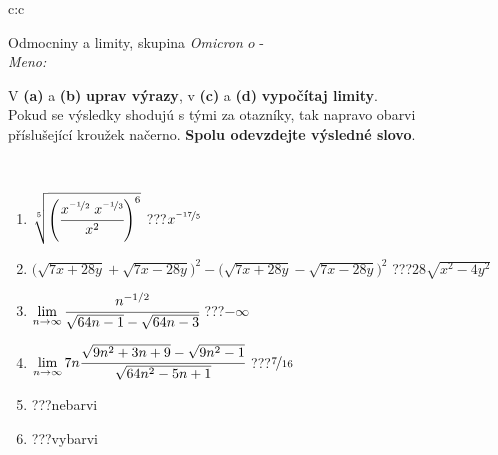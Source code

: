 \documentclass[10pt]{report}
\newcommand\omicron{o}
\begin{document}
\newpage
\thispagestyle{empty}
\begin{tabular}{c:c}
\begin{minipage}[c][104.5mm][t]{0.5\linewidth}
\begin{center}
\vspace{7mm}
{\huge Odmocniny a limity, skupina \textit{Omicron $\omicron$} -}\\[5mm]
\textit{Meno:}\phantom{xxxxxxxxxxxxxxxxxxxxxxxxxxxxxxxxxxxxxxxxxxxxxxxxxxxxxxxxxxxxxxxxx}\\[5mm]
\begin{minipage}{0.95\linewidth}
\begin{center}
V \textbf{(a)} a \textbf{(b)} \textbf{uprav výrazy}, v \textbf{(c)} a \textbf{(d)} \textbf{vypočítaj limity}.\\Pokud se výsledky shodujú s tými za otazníky, tak napravo obarvi\\příslušející kroužek načerno. \textbf{Spolu odevzdejte výsledné slovo}.
\end{center}
\end{minipage}
\\[1mm]
\begin{minipage}{0.79\linewidth}
\begin{center}
\begin{varwidth}{\linewidth}
\begin{enumerate}
\small
\item $\sqrt[5]{\left(\cfrac{x^{\nicefrac{-1}{2}}\;x^{\nicefrac{-1}{3}}}{x^{2}}\right)^{6}}$\quad \dotfill\; ???\;\dotfill \quad $x^{\nicefrac{-17}{5}}$
\item {\footnotesize{\scriptsize$\big(\sqrt{7x+28y}+\sqrt{7x-28y}\big)^2-\big(\sqrt{7x+28y}-\sqrt{7x-28y}\big)^2$}\quad \dotfill\; ???\;\dotfill \quad $28\sqrt{x^2-4y^2}$}
\item $\lim\limits_{n\to\infty}\cfrac{n^{-1/2}}{\sqrt{64n-1}-\sqrt{64n-3}}$\quad \dotfill\; ???\;\dotfill \quad $-\infty$
\item $\lim\limits_{n\to\infty}7n\cfrac{\sqrt{9n^2+3n+9}-\sqrt{9n^2-1}}{\sqrt{64n^2-5n+1}}$\quad \dotfill\; ???\;\dotfill \quad $\nicefrac{7}{16}$
\item \quad \dotfill\; ???\;\dotfill \quad nebarvi
\item \quad \dotfill\; ???\;\dotfill \quad vybarvi
\end{enumerate}
\end{varwidth}
\end{center}
\end{minipage}
\begin{minipage}{0.20\linewidth}

\end{minipage}
\end{center}
\end{minipage}
\end{tabular}
\end{document}
